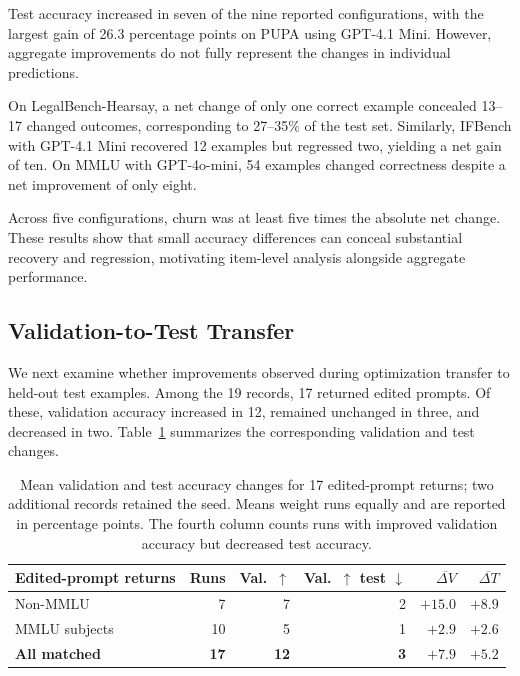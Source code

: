 \documentclass[10pt]{article} %
\begin{document}
Test accuracy increased in seven of the nine reported configurations, with the largest gain of 26.3 percentage points on PUPA using GPT-4.1 Mini. However, aggregate improvements do not fully represent the changes in individual predictions.

On LegalBench-Hearsay, a net change of only one correct example concealed 13--17 changed outcomes, corresponding to 27--35\% of the test set. Similarly, IFBench with GPT-4.1 Mini recovered 12 examples but regressed two, yielding a net gain of ten. On MMLU with GPT-4o-mini, 54 examples changed correctness despite a net improvement of only eight.

Across five configurations, churn was at least five times the absolute net change. These results show that small accuracy differences can conceal substantial recovery and regression, motivating item-level analysis alongside aggregate performance.

\subsection{Validation-to-Test Transfer}
\label{sec:valtest}

We next examine whether improvements observed during optimization transfer to held-out test examples. Among the 19 records, 17 returned edited prompts. Of these, validation accuracy increased in 12, remained unchanged in three, and decreased in two. Table~\ref{tab:gap} summarizes the corresponding validation and test changes.

\begin{table}[!htbp]
\caption{Mean validation and test accuracy changes for 17 edited-prompt returns; two additional records retained the seed. Means weight runs equally and are reported in percentage points. The fourth column counts runs with improved validation accuracy but decreased test accuracy.}
\label{tab:gap}
\centering
\vspace{4pt}
\small
\begin{tabular}{lrrrrr}
\toprule
\rowcolor{midblue}
Edited-prompt returns & Runs & Val.\ $\uparrow$ &
\shortstack{Val.\ $\uparrow$\\test $\downarrow$} &
$\overline{\Delta V}$ & $\overline{\Delta T}$ \\
\midrule
Non-MMLU & 7 & 7 & 2 & $+15.0$ & $+8.9$ \\
MMLU subjects & 10 & 5 & 1 & $+2.9$ & $+2.6$ \\
\textbf{All matched} & \textbf{17} & \textbf{12} & \textbf{3} &
$\mathbf{+7.9}$ & $\mathbf{+5.2}$ \\
\bottomrule
\end{tabular}
\end{table}
\end{document}
